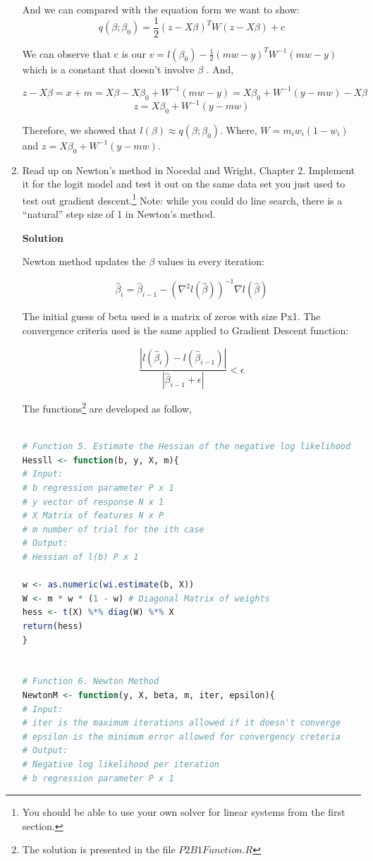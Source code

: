 \documentclass[11 pt]{article}
\begin{document}
\begin{enumerate}[label=(\Alph*)]
And we can compared with the equation form we want to show:
$$ q(\beta; \beta_0) = \frac{1}{2}(z - X \beta)^T W (z - X \beta) + c $$

We can observe that c is our $ v = l(\beta_0) - \frac{1}{2}(mw-y)^TW^{-1} (mw-y)$ which is a constant that doesn't involve $\beta$ . And,

$$ z - X \beta = x+m = X \beta - X \beta_0 +  W^{-1} (mw-y) =  X \beta_0 +  W^{-1} (y - mw) - X \beta  $$
$$  z  = X \beta_0 +  W^{-1} (y - mw) $$

Therefore, we showed that $l(\beta) \approx q(\beta; \beta_0) $. Where, $W = m_i w_i(1-w_i)$ and $  z  = X \beta_0 +  W^{-1} (y - mw) $.
\newpage
\item Read up on Newton's method in Nocedal and Wright, Chapter 2.  Implement it for the logit model and test it out on the same data set you just used to test out gradient descent.\footnote{You should be able to use your own solver for linear systems from the first section.}  Note: while you could do line search, there is a ``natural'' step size of 1 in Newton's method.

\vspace{2mm}
\textbf{Solution}

Newton method updates the $\beta$ values in every iteration:

$$ \hat\beta_{i} = \hat\beta_{i-1} - (\nabla^2 l(\hat\beta))^{-1} \nabla l(\hat\beta) $$

The initial guess of beta used is a matrix of zeros with size Px1. The convergence criteria used is the same applied to Gradient Descent function:

$$ \frac{|l(\hat\beta_i) - l(\hat\beta_{i-1})|}{|\hat\beta_{i-1} + \epsilon|} < \epsilon$$

The functions\footnote{The solution is presented in the file $P2B1Function.R$} are developed as follow, 

\begin{lstlisting}[language=R]

# Function 5. Estimate the Hessian of the negative log likelihood
Hessll <- function(b, y, X, m){
# Input:
# b regression parameter P x 1
# y vector of response N x 1
# X Matrix of features N x P
# m number of trial for the ith case
# Output:
# Hessian of l(b) P x 1 

w <- as.numeric(wi.estimate(b, X))
W <- m * w * (1 - w) # Diagonal Matrix of weights
hess <- t(X) %*% diag(W) %*% X
return(hess)
}


# Function 6. Newton Method
NewtonM <- function(y, X, beta, m, iter, epsilon){
# Input:
# iter is the maximum iterations allowed if it doesn't converge
# epsilon is the minimum error allowed for convergency creteria
# Output:
# Negative log likelihood per iteration
# b regression parameter P x 1


\end{lstlisting}
\end{enumerate}
\end{document}
